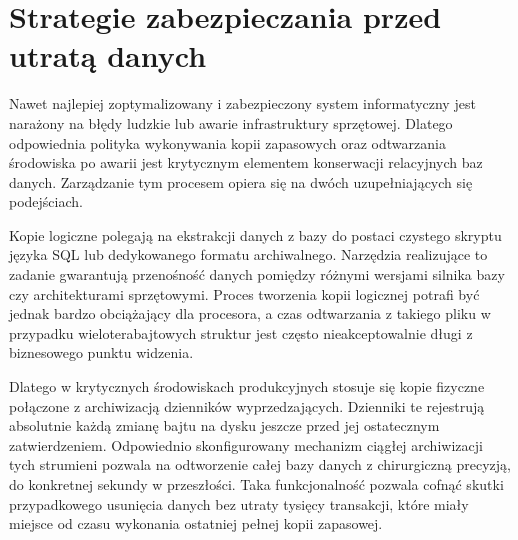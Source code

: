 \documentclass[letterpaper,10pt,english]{sphinxmanual}
\begin{document}
\begin{sphinxVerbatim}[commandchars=\\\{\}]
\end{sphinxVerbatim}


\section{Strategie zabezpieczania przed utratą danych}
\label{\detokenize{rozdzial_1/index:strategie-zabezpieczania-przed-utrata-danych}}
\sphinxAtStartPar
Nawet najlepiej zoptymalizowany i zabezpieczony system informatyczny jest narażony na błędy ludzkie lub awarie infrastruktury sprzętowej. Dlatego odpowiednia polityka wykonywania kopii zapasowych oraz odtwarzania środowiska po awarii jest krytycznym elementem konserwacji relacyjnych baz danych. Zarządzanie tym procesem opiera się na dwóch uzupełniających się podejściach.

\sphinxAtStartPar
Kopie logiczne polegają na ekstrakcji danych z bazy do postaci czystego skryptu języka SQL lub dedykowanego formatu archiwalnego. Narzędzia realizujące to zadanie gwarantują przenośność danych pomiędzy różnymi wersjami silnika bazy czy architekturami sprzętowymi. Proces tworzenia kopii logicznej potrafi być jednak bardzo obciążający dla procesora, a czas odtwarzania z takiego pliku w przypadku wieloterabajtowych struktur jest często nieakceptowalnie długi z biznesowego punktu widzenia.

\sphinxAtStartPar
Dlatego w krytycznych środowiskach produkcyjnych stosuje się kopie fizyczne połączone z archiwizacją dzienników wyprzedzających. Dzienniki te rejestrują absolutnie każdą zmianę bajtu na dysku jeszcze przed jej ostatecznym zatwierdzeniem. Odpowiednio skonfigurowany mechanizm ciągłej archiwizacji tych strumieni pozwala na odtworzenie całej bazy danych z chirurgiczną precyzją, do konkretnej sekundy w przeszłości. Taka funkcjonalność pozwala cofnąć skutki przypadkowego usunięcia danych bez utraty tysięcy transakcji, które miały miejsce od czasu wykonania ostatniej pełnej kopii zapasowej.
\end{document}
